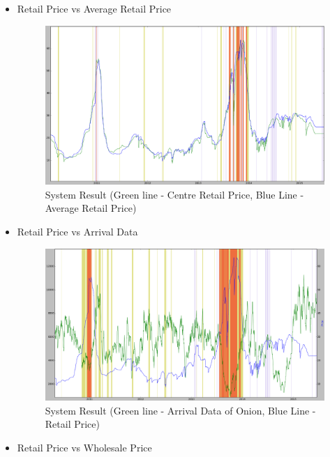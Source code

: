 \begin{itemize}
 \item Retail Price vs Average Retail Price
			
			\begin{figure}[H]
		    	\centering
  		    	\includegraphics[width=1.1\textwidth]{graphs/RvsAvg_Whole.png}
		    	\caption{System Result (Green line - Centre Retail Price, Blue Line - Average Retail Price)}
		    	\label{fig:RvsR}
			\end{figure}
			
	
 \item Retail Price vs Arrival Data
			
			\begin{figure}[H]
		    	\centering
  		    	\includegraphics[width=1.1\textwidth]{graphs/RetailVsArrival_whole.png}
		    	\caption{System Result (Green line - Arrival Data of Onion, Blue Line - Retail Price)}
		    	\label{fig:RvsA}
			\end{figure}
			
	
 \item Retail Price vs Wholesale Price
			

\end{itemize}
